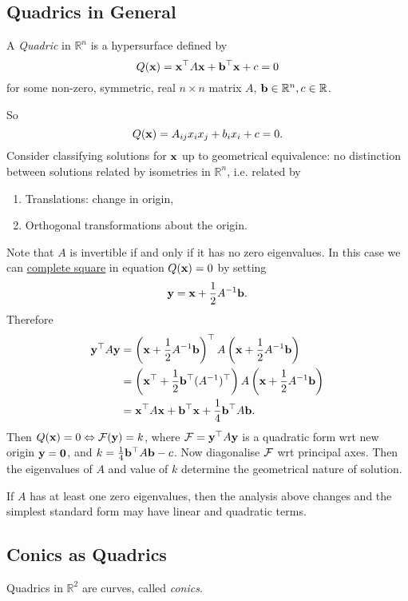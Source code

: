 \documentclass[10pt]{article}
\begin{document}
    \subsection{Quadrics in General}
    \begin{definition}
        A \textit{Quadric} in $ \mathbb{R}^{n} $ is a hypersurface defined by
    \[
        Q({\bf x})={\bf x}^\top A{\bf x}+ {\bf b}^\top{\bf x}+c=0
    \]
    for some non-zero, symmetric, real $n\times n$ matrix $A$, $ {\bf b}\in \mathbb{R}^{n},c\in \mathbb{R} $.
    \end{definition}
    So
    \[
        Q({\bf x}) = A_{ij}x_i x_j+b_ix_i+c=0.
    \]
    Consider classifying solutions for $ {\bf x} $ up to geometrical equivalence: no distinction between solutions related by isometries in $ \mathbb{R}^{n} $, i.e. related by 
    \begin{enumerate}
        \item Translations: change in origin,
        \item Orthogonal transformations about the origin.
    \end{enumerate}
    Note that $A$ is invertible if and only if it has no zero eigenvalues. In this case we can \underline{complete square} in equation $ Q({\bf x})=0 $ by setting 
    \[
        {\bf y} = {\bf x} + \frac{1}{2} A^{-1} {\bf b}.
    \]
    Therefore 
    \begin{align*}
        {\bf y}^\top A{\bf y} &= \left( {\bf x} + \frac{1}{2} A^{-1} {\bf b} \right)^\top A \left( {\bf x} + \frac{1}{2} A^{-1} {\bf b} \right)\\
        &= \left( {\bf x}^\top +\frac{1}{2} {\bf b}^\top (A^{-1})^\top \right)A \left( {\bf x} + \frac{1}{2} A^{-1} {\bf b} \right)\\
        &={\bf x}^\top A{\bf x}+{\bf b}^\top {\bf x}+\frac{1}{4}{\bf b}^\top A{\bf b}.
    \end{align*}
    Then $ Q({\bf x})=0 \Leftrightarrow {\mathcal{F}}({\bf y})=k $, where $ {\mathcal{F}}= {\bf y}^\top A{\bf y}$ is a quadratic form wrt new origin $ {\bf y}=\mathbf{0} $, and $ k= \frac{1}{4}{\bf b}^\top A{\bf b}-c$. Now diagonalise $ {\mathcal{F}}$ wrt principal axes. Then the eigenvalues of $A$ and value of $k$ determine the geometrical nature of solution.
    \begin{remark}
        If $A$ has at least one zero eigenvalues, then the analysis above changes and the simplest standard form may have linear and quadratic terms.
    \end{remark}
    \subsection{Conics as Quadrics}
    Quadrics in $ \mathbb{R}^{2} $ are curves, called \textit{conics}.
\end{document}
